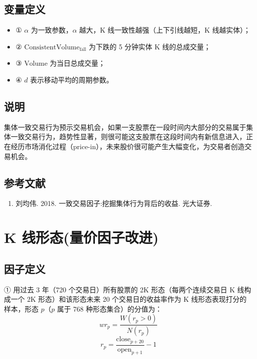 \documentclass{article}
\begin{document}
\subsection{变量定义}
\begin{itemize}
    \item ① \( \alpha \) 为一致参数，\( \alpha \) 越大，K 线一致性越强（上下引线越短，K 线越实体）；
    \item ② \( \mathrm{ConsistentVolume}_{\mathrm{fall}} \) 为下跌的 5 分钟实体 K 线的总成交量；
    \item ③ \( \mathrm{Volume} \) 为当日总成交量；
    \item ④ \( d \) 表示移动平均的周期参数。
\end{itemize}

\subsection{说明}
集体一致交易行为预示交易机会，如果一支股票在一段时间内大部分的交易属于集体一致交易行为，趋势性显著，则很可能这支股票在这段时间内有新信息进入，正在经历市场消化过程（price-in），未来股价很可能产生大幅变化，为交易者创造交易机会。

\subsection{参考文献}
\begin{enumerate}
    \item 刘均伟. 2018. 一致交易因子:挖掘集体行为背后的收益. 光大证券.
\end{enumerate}

\section{K 线形态(量价因子改进)}

\subsection{因子定义}

① 用过去 3 年（720 个交易日）所有股票的 2K 形态（每两个连续交易日 K 线构成一个 2K 形态）和该形态未来 20 个交易日的收益率作为 K 线形态表现打分的样本，形态 \( p \)（\( p \) 属于 768 种形态集合）的分值为：
\begin{equation}
    wr_p = \frac{W(r_p > 0)}{N(r_p)}
\end{equation}
\begin{equation}
    r_p = \frac{\mathrm{close}_{p+20}}{\mathrm{open}_{p+1}} - 1
\end{equation}
\end{document}
